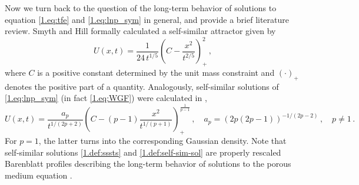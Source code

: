 \documentclass[12pt]{amsart}
\let\pa\partial
\theoremstyle{plain}
\theoremstyle{definition}
\theoremstyle{remark}
\begin{document}
Now we turn back to the question of the long-term behavior of solutions to equation \eqref{1.eq:tfe} and \eqref{1.eq:lnp_sym} in general, and provide a brief literature review. Smyth and Hill \cite{SmHi88} formally calculated a self-similar attractor given by
\begin{equation}\label{1.def:sssts}
    U(x,t) = \frac{1}{24\, t^{1/5}}\left(C - \frac{x^2}{t^{2/5}}\right)_+^2\,,
\end{equation}
where $C$ is a positive constant determined by the unit mass constraint and $(\cdot)_+$ denotes the positive part of a quantity. Analogously, self-similar solutions of \eqref{1.eq:lnp_sym} (in fact \eqref{1.eq:WGF}) were calculated in \cite{DeMc08},
\begin{equation}\label{1.def:self-sim-sol}
    U(x,t) = \frac{a_p}{t^{1/(2p+2)}}\left(C - (p-1)\frac{x^2}{t^{1/(p+1)}}\right)_+^{\frac{1}{p-1}}\,,\quad a_p = \left(2p(2p-1)\right)^{-1/(2p-2)}\,,\quad p\neq 1\,.
\end{equation}
For $p=1$, the latter turns into the corresponding Gaussian density. 
Note that self-similar solutions \eqref{1.def:sssts} and \eqref{1.def:self-sim-sol} are properly rescaled Barenblatt profiles describing the long-term behavior of solutions to the porous medium equation \cite{Vaz07}.

\end{document}
